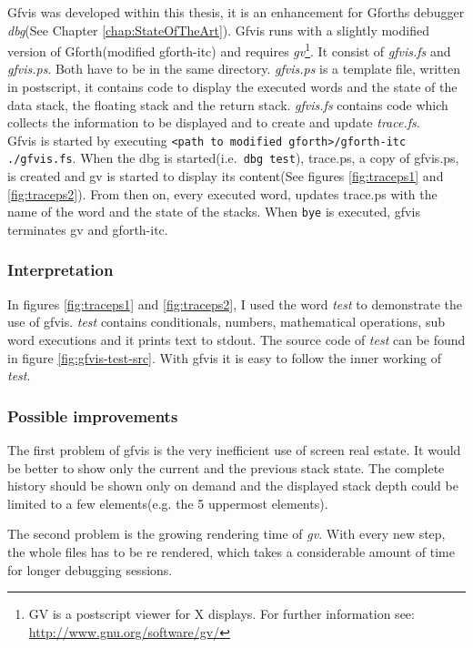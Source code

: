 Gfvis was developed within this thesis, it is an enhancement for Gforths debugger \emph{dbg}(See Chapter \ref{chap:StateOfTheArt}).
Gfvis runs with a slightly modified version of Gforth(modified gforth-itc) and requires \emph{gv}\footnote{GV is a postscript viewer for X displays. For further information see: \url{http://www.gnu.org/software/gv/}}. It consist of \emph{gfvis.fs} and \emph{gfvis.ps}. Both have to be in the same directory. \emph{gfvis.ps} is a template file, written in postscript, it contains code to display the executed words and the state of the data stack, the floating stack and the return stack. \emph{gfvis.fs} contains code which collects the information to be displayed and to create and update \emph{trace.fs}.
\\
Gfvis is started by executing \verb|<path to modified gforth>/gforth-itc ./gfvis.fs|. When the dbg is started(i.e.\ \verb|dbg test|), trace.ps, a copy of gfvis.ps, is created and gv is started to display its content(See figures \ref{fig:traceps1} and \ref{fig:traceps2}). From then on, every executed word, updates trace.ps with the name of the word and the state of the stacks. When \verb|bye| is executed, gfvis terminates gv and gforth-itc.

\subsubsection*{Interpretation}

In figures \ref{fig:traceps1} and \ref{fig:traceps2}, I used the word \emph{test} to demonstrate the use of gfvis. \emph{test} contains conditionals, numbers, mathematical operations, sub word executions and it prints text to stdout. The source code of \emph{test} can be found in figure \ref{fig:gfvis-test-src}. With gfvis it is easy to follow the inner working of \emph{test}.

\subsubsection*{Possible improvements}

The first problem of gfvis is the very inefficient use of screen real estate. It would be better to show only the current and the previous stack state. The complete history should be shown only on demand and the displayed stack depth could be limited to a few elements(e.g. the 5 uppermost elements).

The second problem is the growing rendering time of \emph{gv}. With every new step, the whole files has to be re rendered, which takes a considerable amount of time for longer debugging sessions.

